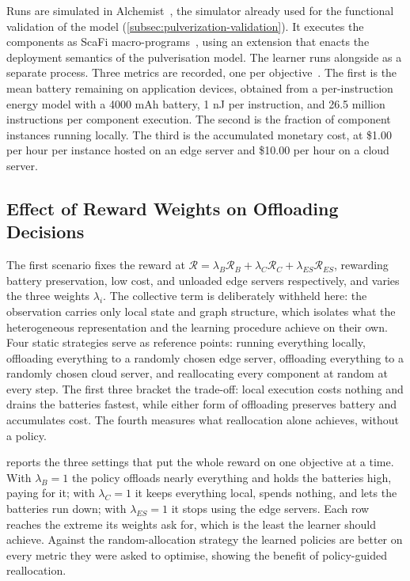 Runs are simulated in Alchemist~\cite{DBLP:journals/jos/PianiniMV13},
the simulator already used for the functional validation of the model (\cref{subsec:pulverization-validation}).
%
It executes the components as ScaFi macro-programs~\cite{casadei2022scafi},
using an extension that enacts the deployment semantics of the pulverisation model.
%
The learner runs alongside as a separate process.
%
Three metrics are recorded, one per objective~\cite{Farabegoli:2026:HeteroGNN}.
%
The first is the mean battery remaining on application devices,
obtained from a per-instruction energy model with a 4000 mAh battery,
1 nJ per instruction,
and 26.5 million instructions per component execution.
%
The second is the fraction of component instances running locally.
%
The third is the accumulated monetary cost, at \$1.00 per hour per instance hosted on an edge server and \$10.00 per hour on a cloud server.

\subsection{Effect of Reward Weights on Offloading Decisions}
\label{subsec:idhgql-multiobjective}

The first scenario fixes the reward at
$\mathcal{R} = \lambda_B \mathcal{R}_B + \lambda_C \mathcal{R}_C + \lambda_{ES} \mathcal{R}_{ES}$,
rewarding battery preservation, low cost, and unloaded edge servers respectively,
and varies the three weights $\lambda_i$.
%
The collective term is deliberately withheld here:
the observation carries only local state and graph structure,
which isolates what the heterogeneous representation and the learning procedure achieve on their own.
%
Four static strategies serve as reference points:
running everything locally,
offloading everything to a randomly chosen edge server,
offloading everything to a randomly chosen cloud server,
and reallocating every component at random at every step.
%
The first three bracket the trade-off:
local execution costs nothing and drains the batteries fastest,
while either form of offloading preserves battery and accumulates cost.
%
The fourth measures what reallocation alone achieves, without a policy.

 reports the three settings that put the whole reward on one objective at a time.
%
With $\lambda_B = 1$ the policy offloads nearly everything and holds the batteries high, paying for it;
with $\lambda_C = 1$ it keeps everything local, spends nothing, and lets the batteries run down;
with $\lambda_{ES} = 1$ it stops using the edge servers.
%
Each row reaches the extreme its weights ask for, which is the least the learner should achieve.
%
Against the random-allocation strategy the learned policies are better on every metric they were asked to optimise,
showing the benefit of policy-guided reallocation.

